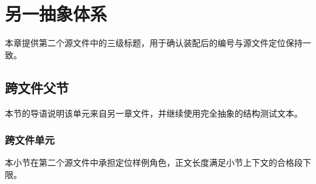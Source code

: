 \chapter{另一抽象体系}
本章提供第二个源文件中的三级标题，用于确认装配后的编号与源文件定位保持一致。

\section{跨文件父节}
本节的导语说明该单元来自另一章文件，并继续使用完全抽象的结构测试文本。

\subsection{跨文件单元}
本小节在第二个源文件中承担定位样例角色，正文长度满足小节上下文的合格段下限。
